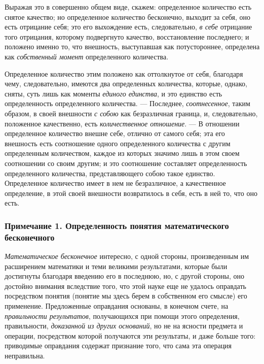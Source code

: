 Выражая это в совершенно общем виде, скажем: определенное количество есть
снятое качество; но определенное количество бесконечно, выходит за себя,
оно есть отрицание себя; это его выхождение есть, следовательно,
{\em в себе} отрицание того отрицания, которому
подвергнуто качество, восстановление последнего; и положено именно то, что
внешность, выступавшая как потустороннее, определена как
{\em собственный момент} определенного количества.

Определенное количество этим положено как оттолкнутое от себя, благодаря
чему, следовательно, имеются два определенных количества, которые, однако,
сняты, суть лишь как моменты {\em единого единства}, и
это единство есть определенность определенного количества. — Последнее,
{\em соотнесенное}, таким образом, в своей внешности
{\em с собою} как безразличная граница, и,
следовательно, положенное качественно, есть
{\em количественное отношение}. — В отношении
определенное количество внешне себе, отлично от самого себя; эта его
внешность есть соотношение одного определенного количества с другим
определенным количеством, каждое из которых значимо лишь в этом своем
соотношении со своим другим; и это соотношение составляет определенность
определенного количества, представляющего собою такое единство.
Определенное количество имеет в нем не безразличное, а качественное
определение, в этой своей внешности возвратилось в себя, есть в ней то, что
оно есть.

\subsubsection[Примечание 1. Определенность понятия математического бесконечного]
{Примечание 1. Определенность понятия математического бесконечного}

{\em Математическое бесконечное} интересно, с одной
стороны, произведенным им расширением математики и теми великими
результатами, которые были достигнуты благодаря введению его в последнюю,
но, с другой стороны, оно достойно внимания вследствие того, что этой науке
еще не удалось оправдать посредством понятия (понятие мы здесь берем в
собственном его смысле) его применение. Предложенные оправдания основаны, в
конечном счете, на {\em правильности результатов},
получающихся при помощи этого определения, правильности,
{\em доказанной из других оснований}, но не на ясности
предмета и операции, посредством которой получаются эти результаты, и даже
больше того: приводимые оправдания содержат признание того, что сама эта
операция неправильна.

